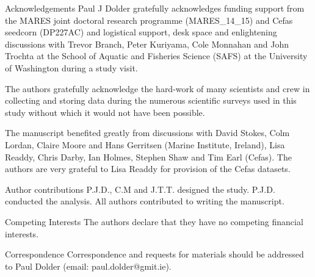 \documentclass{nature}
\begin{document}
\newpage


\begin{addendum}
 \item [Acknowledgements] Paul J Dolder gratefully acknowledges funding support
	 from the MARES joint doctoral research programme (MARES\_14\_15) and
	 Cefas seedcorn (DP227AC) and logistical support, desk space and
	 enlightening discussions with Trevor Branch, Peter Kuriyama, Cole
	 Monnahan and John Trochta at the School of Aquatic and Fisheries
	 Science (SAFS) at the University of Washington during a study visit.
	 
	 The authors gratefully acknowledge the hard-work of many scientists
	 and crew in collecting and storing data during the numerous scientific
	 surveys used in this study without which it would not have been
	 possible.  
	 
	 The manuscript benefited greatly from discussions with David Stokes,
	 Colm Lordan, Claire Moore and Hans Gerritsen (Marine Institute,
	 Ireland), Lisa Readdy, Chris Darby, Ian Holmes, Stephen Shaw and Tim
	 Earl (Cefas).  The authors are very grateful to Lisa Readdy for
	 provision of the Cefas datasets.

 \item[Author contributions] P.J.D., C.M and J.T.T. designed the study. P.J.D.
	 conducted the analysis. All authors contributed to writing the
	 manuscript.  

 \item[Competing Interests] The authors declare that they have
	 no competing financial interests.
 \item[Correspondence] Correspondence and requests for materials
 should be addressed to Paul Dolder (email: paul.dolder@gmit.ie).
 \end{addendum}


\end{document}
